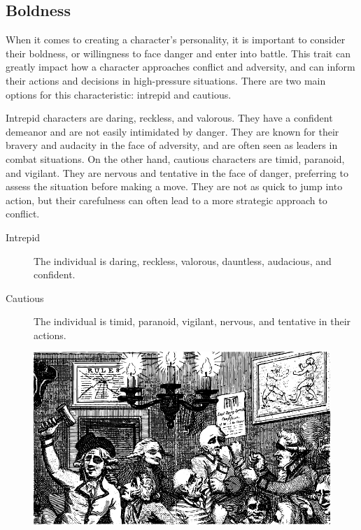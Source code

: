 \documentclass[12pt]{book}  %
\begin{document}
\subsection{\textbf{Boldness}}

When it comes to creating a character's personality, it is important to consider their boldness, or willingness to face danger and enter into battle. This trait can greatly impact how a character approaches conflict and adversity, and can inform their actions and decisions in high-pressure situations. There are two main options for this characteristic: intrepid and cautious.

Intrepid characters are daring, reckless, and valorous. They have a confident demeanor and are not easily intimidated by danger. They are known for their bravery and audacity in the face of adversity, and are often seen as leaders in combat situations. On the other hand, cautious characters are timid, paranoid, and vigilant. They are nervous and tentative in the face of danger, preferring to assess the situation before making a move. They are not as quick to jump into action, but their carefulness can often lead to a more strategic approach to conflict.

\begin{description}
    \item[Intrepid] The individual is daring, reckless, valorous, dauntless, audacious, and confident.
    \item[Cautious] The individual is timid, paranoid, vigilant, nervous, and tentative in their actions.
\end{description}

\begin{figure}[h]
    \centering
    \includegraphics[width=\textwidth]{./images/personality05.pdf}
\end{figure}
\end{document}
